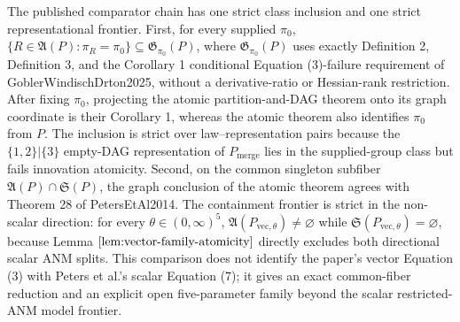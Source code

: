 The published comparator chain has one strict class inclusion and one strict representational frontier. First, for every supplied \(\pi_0\), \(\{R\in\mathfrak A(P):\pi_R=\pi_0\}\subseteq\mathfrak G_{\pi_0}(P)\), where \(\mathfrak G_{\pi_0}(P)\) uses exactly Definition 2, Definition 3, and the Corollary 1 conditional Equation (3)-failure requirement of GoblerWindischDrton2025, without a derivative-ratio or Hessian-rank restriction. After fixing \(\pi_0\), projecting the atomic partition-and-DAG theorem onto its graph coordinate is their Corollary 1, whereas the atomic theorem also identifies \(\pi_0\) from \(P\). The inclusion is strict over law--representation pairs because the \(\{1,2\}|\{3\}\) empty-DAG representation of \(P_{\mathrm{merge}}\) lies in the supplied-group class but fails innovation atomicity. Second, on the common singleton subfiber \(\mathfrak A(P)\cap\mathfrak S(P)\), the graph conclusion of the atomic theorem agrees with Theorem 28 of PetersEtAl2014. The containment frontier is strict in the non-scalar direction: for every \(\theta\in(0,\infty)^5\), \(\mathfrak A(P_{\mathrm{vec},\theta})\neq\varnothing\) while \(\mathfrak S(P_{\mathrm{vec},\theta})=\varnothing\), because Lemma \(\ref{lem:vector-family-atomicity}\) directly excludes both directional scalar ANM splits. This comparison does not identify the paper's vector Equation (3) with Peters et al.'s scalar Equation (7); it gives an exact common-fiber reduction and an explicit open five-parameter family beyond the scalar restricted-ANM model frontier.